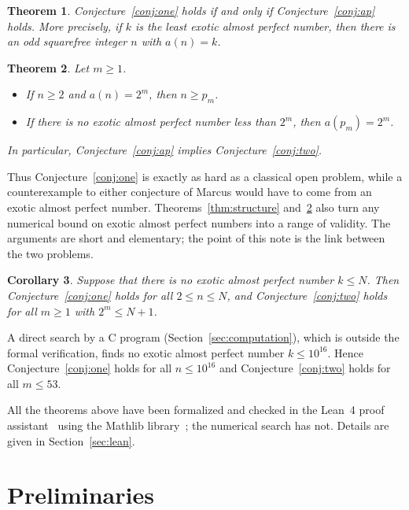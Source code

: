 \documentclass[12pt,reqno]{article}
\theoremstyle{plain}
\newtheorem{theorem}{Theorem}
\newtheorem{corollary}[theorem]{Corollary}
\theoremstyle{definition}
\theoremstyle{remark}
\begin{document}
\begin{theorem}\label{thm:equiv}
Conjecture~\ref{conj:one} holds if and only if Conjecture~\ref{conj:ap} holds.
More precisely, if $k$ is the least exotic almost perfect number, then there is
an odd squarefree integer $n$ with $a(n) = k$.
\end{theorem}

\begin{theorem}\label{thm:two}
Let $m \ge 1$.
\begin{itemize}
\item[(a)] If $n \ge 2$ and $a(n) = 2^m$, then $n \ge p_m$.
\item[(b)] If there is no exotic almost perfect number less than $2^m$, then
$a(p_m) = 2^m$.
\end{itemize}
In particular, Conjecture~\ref{conj:ap} implies Conjecture~\ref{conj:two}.
\end{theorem}

Thus Conjecture~\ref{conj:one} is exactly as hard as a classical open problem,
while a counterexample to either conjecture of Marcus would have to come from an
exotic almost perfect number. Theorems~\ref{thm:structure} and~\ref{thm:two}
also turn any numerical bound on exotic almost perfect numbers into a range of
validity. The arguments are short and elementary; the point of this note is the
link between the two problems.

\begin{corollary}\label{cor:bound}
Suppose that there is no exotic almost perfect number $k \le N$. Then
Conjecture~\ref{conj:one} holds for all $2 \le n \le N$, and
Conjecture~\ref{conj:two} holds for all $m \ge 1$ with $2^m \le N+1$.
\end{corollary}

A direct search by a C program (Section~\ref{sec:computation}), which is
outside the formal verification, finds no exotic almost perfect number
$k \le 10^{16}$. Hence Conjecture~\ref{conj:one} holds for all
$n \le 10^{16}$ and Conjecture~\ref{conj:two} holds for all $m \le 53$.

All the theorems above have been formalized and checked in the Lean~4 proof
assistant~\cite{lean4} using the Mathlib library~\cite{mathlib}; the numerical
search has not. Details are given in Section~\ref{sec:lean}.

\section{Preliminaries}
\end{document}
